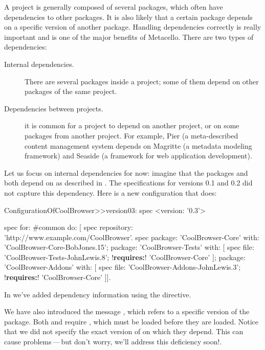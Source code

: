 \documentclass[a4paper,10pt,twoside]{book}
\begin{document}
A project is generally composed of several packages, which often have dependencies to other packages.  It is also likely that a certain package depends on a specific version of another package. Handling dependencies correctly is really important and  is one of the major benefits of Metacello. There are two types of dependencies:
\begin{description}
\item[Internal dependencies.] There are several packages inside a project; some of them depend on other packages of the same project. 
\item[Dependencies between projects.] it is common for a project to depend on another project, or on some packages from another project. 
For example, Pier (a meta-described content management system depends on Magritte (a metadata modeling framework) and Seaside (a framework for web application development).
\end{description}



Let us focus on internal dependencies for now: imagine that the packages  and  both depend on  as described in . The specifications for versions 0.1 and 0.2 did not capture this dependency. Here is a new configuration that does:

\begin{code}{}
ConfigurationOfCoolBrowser>>version03: spec 
       <version: '0.3'>
       
       spec for: #common do: [
              spec repository: 'http://www.example.com/CoolBrowser'.
              spec 
                     package: 'CoolBrowser-Core' with: 'CoolBrowser-Core-BobJones.15';
                     package: 'CoolBrowser-Tests' with: [
                            spec 
                                   file: 'CoolBrowser-Tests-JohnLewis.8';
                                   !\textbf{requires:}! 'CoolBrowser-Core' ];
                     package: 'CoolBrowser-Addons' with: [
                            spec 
                                   file: 'CoolBrowser-Addons-JohnLewis.3';
                                   !\textbf{requires:}! 'CoolBrowser-Core' ]].
\end{code}

\noindent
In  we've added dependency information using the  directive.

We have also introduced the  message%
, which refers to a specific version   of the package. Both  and   require , which must be loaded before they are loaded. 
Notice that we did not specify the exact version of  on which they depend.  This can cause problems\,---\,but don't worry, we'll address this deficiency soon!.
\end{document}

